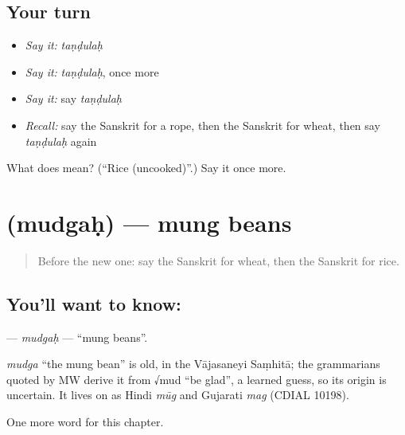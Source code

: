 \subsection*{Your turn}
\begin{itemize}
\raggedright
  \item \emph{Say it:} \emph{taṇḍulaḥ}
  \item \emph{Say it:} \emph{taṇḍulaḥ}, once more
  \item \emph{Say it:} say \emph{taṇḍulaḥ}
  \item \emph{Recall:} say the Sanskrit for a rope, then the Sanskrit for wheat, then say \emph{taṇḍulaḥ} again
\end{itemize}

\begin{tcolorbox}[breakable,colback=teal!4,colframe=teal!35!black,title={Before you move on}]
What does  mean? (\textquotedblleft{}Rice (uncooked)\textquotedblright{}.) Say it once more.
\end{tcolorbox}
\section[\texorpdfstring{\sk{मुद्गः} (mudgaḥ)}{मुद्गः (mudgaḥ)}]{ (mudgaḥ) — mung beans}

\label{lesson:SA-C106-mudgah}



\begin{quote}
Before the new one: say the Sanskrit for wheat, then the Sanskrit for rice.
\end{quote}

\subsection*{You'll want to know: }
\textbf{} — \emph{mudgaḥ} — \textquotedblleft{}mung beans\textquotedblright{}.

\begin{cousinweb}
\emph{mudga} \textquotedblleft{}the mung bean\textquotedblright{} is old, in the Vājasaneyi Saṃhitā; the grammarians quoted by MW derive it from √mud \textquotedblleft{}be glad\textquotedblright{}, a learned guess, so its origin is uncertain. It lives on as Hindi \emph{mūg} and Gujarati \emph{mag} (CDIAL 10198).
\end{cousinweb}

\begin{grammarlens}[title={What you've built}]
One more word for this chapter.
\end{grammarlens}

